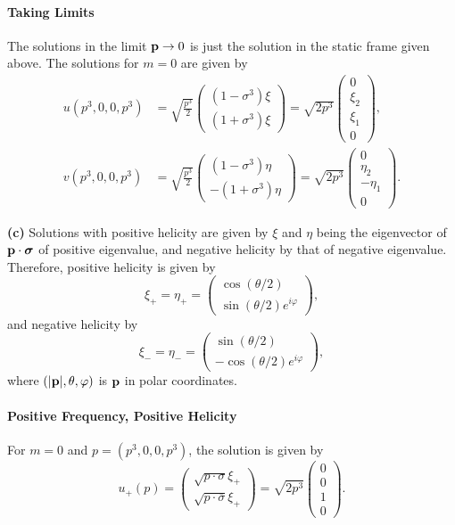 \documentclass{article}
\makeatletter
\newcommand*{\shifttext}[1]{%
  \settowidth{\@tempdima}{#1}%
  \hspace{-\@tempdima}#1%
}
\newcommand{\plabel}[1]{%
\shifttext{\textbf{#1}\quad}%
}
\makeatother
\begin{document}
\paragraph*{Taking Limits}
The solutions in the limit $\vb{p}\rightarrow 0$ is just the solution in the static frame given above.
The solutions for $m = 0$ are given by
\begin{align*}
    u(p^3,0,0,p^3) &= \sqrt{\frac{p^3}{2}} \begin{pmatrix}
        (1-\sigma^3) \xi \\
        (1+\sigma^3) \xi
    \end{pmatrix} = \sqrt{2p^3}\begin{pmatrix}
        0 \\ \xi_2 \\
        \xi_1 \\ 0
    \end{pmatrix}, \\
    v(p^3,0,0,p^3) &= \sqrt{\frac{p^3}{2}} \begin{pmatrix}
        (1-\sigma^3) \eta \\
        -(1+\sigma^3) \eta
    \end{pmatrix} = \sqrt{2p^3}\begin{pmatrix}
        0 \\ \eta_2 \\
        -\eta_1 \\ 0
    \end{pmatrix}.
\end{align*}

\plabel{(c)}%
Solutions with positive helicity are given by $\xi$ and $\eta$ being the eigenvector of $\vb{p}\cdot \vb*{\sigma}$ of positive eigenvalue, and negative helicity by that of negative eigenvalue.
Therefore, positive helicity is given by
\[ \xi_+ = \eta_+ = \begin{pmatrix}
    \cos(\theta/2) \\ \sin(\theta/2) e^{i\varphi}
\end{pmatrix}, \]
and negative helicity by
\[ \xi_- = \eta_- = \begin{pmatrix}
    \sin(\theta/2) \\ -\cos(\theta/2) e^{i\varphi}
\end{pmatrix}, \]
where $(\abs{\vb{p}}, \theta,\varphi)$ is $\vb{p}$ in polar coordinates.

\paragraph*{Positive Frequency, Positive Helicity}
For $m=0$ and $p=(p^3,0,0,p^3)$, the solution is given by
\[ u_+(p) = \begin{pmatrix}
    \sqrt{p\cdot \sigma} \xi_+ \\
    \sqrt{p\cdot \overline{\sigma}} \xi_+
\end{pmatrix} = \sqrt{2p^3} \begin{pmatrix}
    0 \\ 0 \\ 1 \\ 0
\end{pmatrix}. \]
\end{document}
